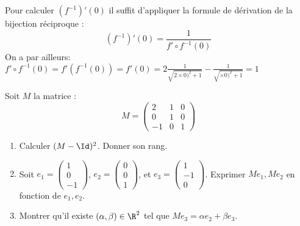 \documentclass[a4paper, 11pt,reqno]{article}
\begin{document}
\begin{correction}
\begin{enumerate}
\begin{enumerate}
Pour calculer $(f^{-1} )'(0)$ il suffit d'appliquer la formule de dérivation de la bijection réciproque : 
$$(f^{-1})'(0) =\frac{1}{f'\circ f^{-1}(0) }$$
On a par ailleurs: 
$f'\circ f^{-1}(0) = f'(f^{-1}(0)) = f'(0) = 2\frac{1}{\sqrt{2\times 0)^2 +1 }  }- \frac{1}{\sqrt{\times 0)^2 +1 }  }=1$


\end{enumerate}
\end{enumerate}


\end{correction}

\vspace{0.5cm}
\newpage

\begin{exercice}
Soit $M$ la matrice : 
$$M=\left( \begin{array}{ccc}
2 &1& 0\\
0 &1 & 0  \\
 -1&0&1
\end{array}\right) $$

\begin{enumerate}
\item Calculer $(M- \Id)^2$. Donner son rang.

 \item Soit $e_1= \left(
\begin{array}{c}
1\\
0\\
-1
\end{array}
 \right)$,  $e_2= \left(
\begin{array}{c}
0\\
0\\
1
\end{array}
 \right)$, et  $e_3= \left(
\begin{array}{c}
1\\
-1\\
0
\end{array}
 \right)$.
Exprimer  $Me_1, Me_2$ en fonction de $e_1, e_2$.
\item Montrer qu'il existe $(\alpha, \beta)\in \R^2$ tel que $M e_3 = \alpha e_2 +\beta e_3$.
 

\end{enumerate}
\end{exercice}
\end{document}
